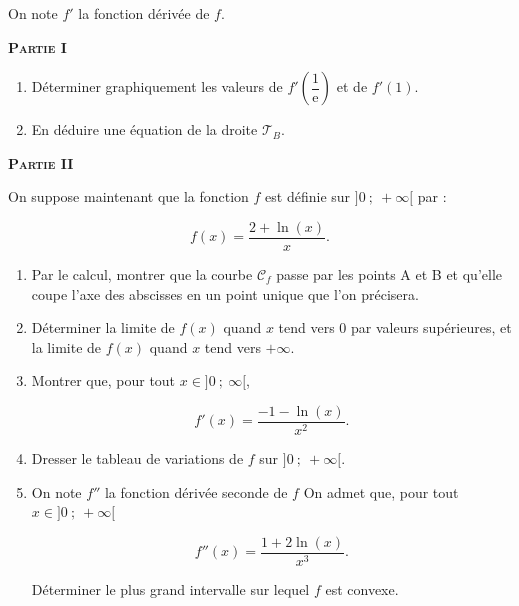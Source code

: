 \documentclass[10pt]{article}
\providecommand{\e}{{\mathrm{e}}}
\begin{document}
\bigskip

On note $f'$ la fonction dérivée de $f$.

\medskip

\textbf{\textsc{Partie} I}

\medskip

\begin{enumerate}
\item  Déterminer graphiquement les valeurs de $f'\left(\dfrac{1}{\e}\right)$ et de $f'(1)$.
\item En déduire une équation de la droite $\mathcal{T}_B$.
\end{enumerate}

\textbf{\textsc{Partie} II}

\medskip

On suppose maintenant que la fonction $f$ est définie sur $]0~;~+\infty[$ par : 

\[f(x) =\dfrac{2+\ln(x)}{x}.\]

\begin{enumerate}
\item Par le calcul, montrer que la courbe $\mathcal{C}_f$ passe par les points A et B et qu’elle coupe l’axe des abscisses en un point unique que l’on précisera.
\item Déterminer la limite de $f(x)$ quand $x$ tend vers 0 par valeurs supérieures, et la limite de $f(x)$ quand $x$ tend vers $+\infty$.
\item Montrer que, pour tout $x\in]0~;~\infty[$,

\[f'(x)=\dfrac{-1-\ln(x)}{x^2} .\]

\item Dresser le tableau de variations de $f$ sur $]0~;~+\infty[$.
\item On note $f''$ la fonction dérivée seconde de $f$
On admet que, pour tout $x\in]0~;~+\infty[$ 

\[f''(x)=\dfrac{1+2\ln(x)}{x^3} .\]

Déterminer le plus grand intervalle sur lequel $f$ est convexe.
\end{enumerate}

\bigskip
\end{document}
